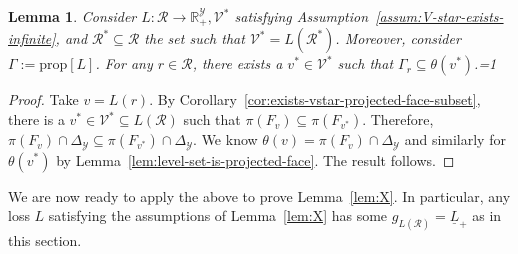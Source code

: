 \documentclass[11pt]{article}
\newcommand{\Comments}{1}
\newcommand{\mytodo}[2]{\ifnum\Comments=1%
  \todo[linecolor=#1!80!black,backgroundcolor=#1,bordercolor=#1!80!black]{#2}\fi}
\newcommand{\btw}[1]{\mytodo{gray!20!white}{BTW: #1}}%
\newcommand{\reals}{\mathbb{R}}
\newcommand{\prop}[1]{\mathrm{prop}[#1]}
\newcommand{\simplex}{\Delta_\Y}
\newcommand{\R}{\mathcal{R}}
\newcommand{\V}{\mathcal{V}}
\newcommand{\Y}{\mathcal{Y}}
\newcommand{\risk}[1]{\underline{#1}}
\newtheorem{lemma}{Lemma}
\begin{document}
\begin{lemma}\label{lem:any-levelset-contained-in-minlevelset}
  Consider $L : \R \to \reals^\Y_+, \V^*$ satisfying Assumption~\ref{assum:V-star-exists-infinite}, and $\R^* \subseteq \R$ the set such that $\V^* = L(\R^*)$.
  Moreover, consider $\Gamma := \prop{L}$.
  For any $r \in \R$, there exists a $v^* \in \V^*$ such that $\Gamma_r \subseteq \theta(v^*)$.\btw{(7)}
\end{lemma}
\begin{proof}
  Take $v = L(r)$.
  By Corollary~\ref{cor:exists-vstar-projected-face-subset}, there is a $v^* \in \V^* \subseteq L(\R)$ such that $\pi(F_v) \subseteq \pi(F_{v^*})$.
  Therefore, $\pi(F_v) \cap \simplex \subseteq \pi(F_{v^*})\cap \simplex$.  
  We know $\theta(v) = \pi(F_v) \cap \simplex$ and similarly for $\theta(v^*)$ by Lemma~\ref{lem:level-set-is-projected-face}.
  The result follows.
\end{proof}



We are now ready to apply the above to prove Lemma~\ref{lem:X}.
In particular, any loss $L$ satisfying the assumptions of Lemma~\ref{lem:X} has some $g_{L(\R)} = \risk{L}_+$ as in this section. 
\end{document}
